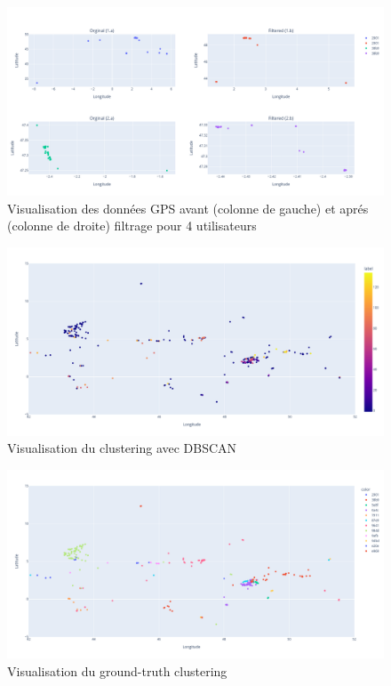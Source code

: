 \documentclass[10pt,a4paper]{article}
\begin{document}
\vspace{5mm}

\begin{figure}[H]
    \includegraphics[scale=0.25]{viz_filtering}
    \centering
    \caption{Visualisation des données GPS avant (colonne de gauche) et aprés (colonne de droite) filtrage pour 4 utilisateurs}
    \label{fig:figure12}
\end{figure}

\begin{figure}[H]
    \includegraphics[scale=0.25]{DBSCAN_cluster}
    \centering
    \caption{Visualisation du clustering avec DBSCAN}
    \label{fig:figure13}
\end{figure}

\begin{figure}[H]
    \includegraphics[scale=0.25]{user_cluster}
    \centering
    \caption{Visualisation du ground-truth clustering}
    \label{fig:figure14}
\end{figure}
\end{document}
